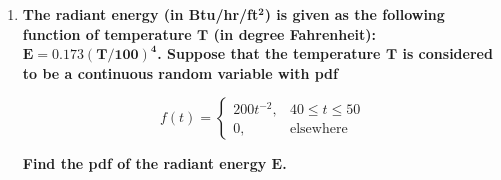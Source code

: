 \documentclass[10pt, oneside]{article}
\begin{document}
\begin{enumerate}[label=5.\arabic*]
\begin{enumerate}
	Namely, we can conclude that $\boxed{ g(y) = \frac{x_0 - a}{ky_0}, 0 < y < \frac{y_0 (k - a)}{x_0 - a}}$ and $\boxed{g(y) = \frac{a}{k}, y = 0}$.
	
	\item  \begin{tcolorbox}[
	  colback=Cerulean!5!white,
	  colframe=Cerulean!75!black]
	\textbf{$\bm{k > x_0}$}
	\end{tcolorbox}
	
	By part (b), we know the probability distribution functions over the $X$ range spaces $(-a,a), (-x_0, -a)$, and $(a, x_0)$; for the latter two pdfs, the interval over $Y$ for which they are defined is $0 < y < y_0$. All that remains is to determine the probability distribution function of $Y$ for when $y = y_0$. Simply, because $Y$ is a constant value for which the equivalent events are $X \in (-k, -x_0)$ and $X \in (x_0, k)$, we may write
	
	\begin{align*}
	P(Y = y_0) &= \int^k_{x_0} \frac{1}{2k} \ dx + \int^{-x_0}_{-k} \frac{1}{2k} \ dx \\
	&= \frac{k - x_0}{2k} + \frac{k - x_0}{2k} = \frac{k - x_0}{k} = 1 - x_0 / k
	\end{align*}
	
	Therefore, the probability distribution function here is:
	
	\[ g(y) = \begin{dcases} a/k, & y = 0 \\
	\frac{x_0 - a}{ky_0}, & 0 < y < y_0 \\
	1 - \frac{x_0}{k}, & y = y_0
	\end{dcases}
	\]
	\end{enumerate}

\item  \begin{tcolorbox}[
  colback=Cerulean!5!white,
  colframe=Cerulean!75!black]
\textbf{The radiant energy (in Btu/hr/ft$\bm{^2}$) is given as the following function of temperature $\bm{T}$ (in degree Fahrenheit): $\bm{E = 0.173 (T / 100)^4}$. Suppose that the temperature $\bm{T}$ is considered to be a continuous random variable with pdf}

\[ f(t) = \begin{cases}  200t^{-2}, & 40 \leq t \leq 50 \\
0, & \text{elsewhere} 
\end{cases} \]

\textbf{Find the pdf of the radiant energy $\bm{E}$.}
\end{tcolorbox}


\end{enumerate}
\end{document}
